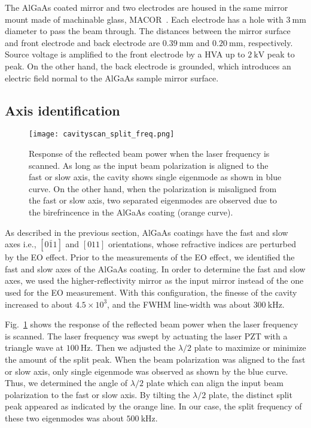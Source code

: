 \documentclass[%
 reprint,
 superscriptaddress,
 amsmath,amssymb,
 aps,
]{revtex4-2}
\newcommand{\unit}[1]{\ \mathrm{#1}}
\begin{document}
The AlGaAs coated mirror and two electrodes are housed in the same mirror mount made of machinable glass, MACOR~\cite{MACOR}.
Each electrode has a hole with $3\unit{mm}$ diameter to pass the beam through.
The distances between the mirror surface and front electrode and back electrode are $0.39\unit{mm}$ and $0.20\unit{mm}$, respectively.
Source voltage is amplified to the front electrode by a HVA up to $2\unit{kV}$ peak to peak.
On the other hand, the back electrode is grounded, which introduces an electric field normal to the AlGaAs sample mirror surface.


\subsection{Axis identification}

\begin{figure}[htbp]
\texttt{[image: cavityscan\_split\_freq.png]}
\caption{
Response of the reflected beam power when the laser frequency is scanned.
As long as the input beam polarization is aligned to the fast or slow axis, the cavity shows single eigenmode as shown in blue curve.
On the other hand, when the polarization is misaligned from the fast or slow axis, two separated eigenmodes are observed due to the birefrincence in the AlGaAs coating (orange curve).
}
\label{fig.split}
\end{figure}

As described in the previous section, AlGaAs coatings have the fast and slow axes i.e., $[0\bar{1}1]$ and $[011]$ orientations, whose refractive indices are perturbed by the EO effect.
Prior to the measurements of the EO effect, we identified the fast and slow axes of the AlGaAs coating.
In order to determine the fast and slow axes, we used the higher-reflectivity mirror as the input mirror instead of the one used for the EO measurement.
With this configuration, the finesse of the cavity increased to about $4.5\times10^3$, and the FWHM line-width was about $300\unit{kHz}$.

Fig.~\ref{fig.split} shows the response of the reflected beam power when the laser frequency is scanned.
The laser frequency was swept by actuating the laser PZT with a triangle wave at $100\unit{Hz}$.
Then we adjusted the $\lambda/2$ plate to maximize or minimize the amount of the split peak.
When the beam polarization was aligned to the fast or slow axis, only single eigenmode was observed as shown by the blue curve.
Thus, we determined the angle of $\lambda/2$ plate which can align the input beam polarization to the fast or slow axis.
By tilting the $\lambda/2$ plate, the distinct split peak appeared as indicated by the orange line.
In our case, the split frequency of these two eigenmodes was about $500\unit{kHz}$.
\end{document}
